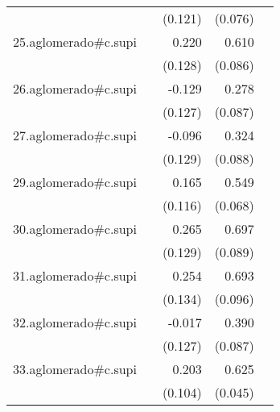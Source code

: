 {\begin{longtable}{l*{4}{D{.}{.}{-1}}}
            &                     &     (0.121)         &     (0.076)         &                     \\
\addlinespace
25.aglomerado#c.supi&                     &       0.220         &       0.610\sym{***}&                     \\
            &                     &     (0.128)         &     (0.086)         &                     \\
\addlinespace
26.aglomerado#c.supi&                     &      -0.129         &       0.278\sym{**} &                     \\
            &                     &     (0.127)         &     (0.087)         &                     \\
\addlinespace
27.aglomerado#c.supi&                     &      -0.096         &       0.324\sym{***}&                     \\
            &                     &     (0.129)         &     (0.088)         &                     \\
\addlinespace
29.aglomerado#c.supi&                     &       0.165         &       0.549\sym{***}&                     \\
            &                     &     (0.116)         &     (0.068)         &                     \\
\addlinespace
30.aglomerado#c.supi&                     &       0.265\sym{*}  &       0.697\sym{***}&                     \\
            &                     &     (0.129)         &     (0.089)         &                     \\
\addlinespace
31.aglomerado#c.supi&                     &       0.254         &       0.693\sym{***}&                     \\
            &                     &     (0.134)         &     (0.096)         &                     \\
\addlinespace
32.aglomerado#c.supi&                     &      -0.017         &       0.390\sym{***}&                     \\
            &                     &     (0.127)         &     (0.087)         &                     \\
\addlinespace
33.aglomerado#c.supi&                     &       0.203         &       0.625\sym{***}&                     \\
            &                     &     (0.104)         &     (0.045)         &                     \\

\end{longtable}}
